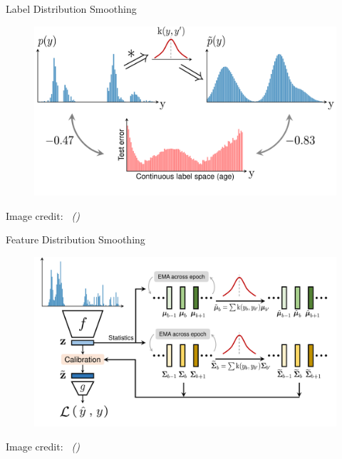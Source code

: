 \documentclass[dvipsnames,
hyperref={
	citecolor=blue,
	colorlinks=true,
	urlcolor=blue,
	linkcolor=,
}
]{beamer}
\newcommand{\credit}[2]{{\par\hfill \tiny #1 credit:~\itshape{\color{blue} \citeauthor{#2} (\citeyear{#2})}}}
\begin{document}
\begin{frame}{Label Distribution Smoothing}
	\begin{figure}[h]
		\includegraphics[width=\linewidth]{images/err_motivate_sep.pdf}
	\end{figure}
	\credit{Image}{yang2021delving}
\end{frame}

\begin{frame}{Feature Distribution Smoothing}
	\begin{figure}[h]
		\includegraphics[width=\linewidth]{images/teaser_fds.pdf}
	\end{figure}
	\credit{Image}{yang2021delving}
\end{frame}

\end{document}

